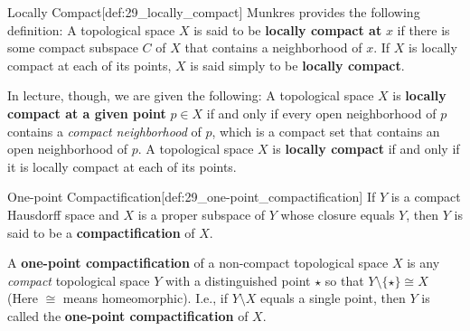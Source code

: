 \begin{defBox}{Locally Compact}[def:29_locally_compact]
    Munkres provides the following definition: A topological space \( X \) is said 
    to be \textbf{locally compact at} \( x \) if there is some compact subspace \( C \)
    of \( X \) that contains a neighborhood of \( x \).
    If \( X \) is locally compact at each of its points, \( X \) is said simply 
    to be \textbf{locally compact}.

    \baseSkip 

    In lecture, though, we are given the following:
    A topological space \( X \) is 
    \textbf{locally compact at a given point} \( p \in X \) if and only 
    if every open neighborhood of \( p \) contains a \textit{compact
    neighborhood} of \( p \), which is a compact set that contains an open 
    neighborhood of \( p \).
    A topological space \( X \) is \textbf{locally compact} if and only
    if it is locally compact at each of its points.
\end{defBox}

\begin{defBox}{One-point Compactification}[def:29_one-point_compactification]
    If \( Y \) is a compact Hausdorff space and \( X \) is a proper 
    subspace of \( Y \) whose closure equals \( Y \), then \( Y \) is said to
    be a \textbf{compactification} of \( X \).

    \baseSkip
    
    A \textbf{one-point compactification} of a non-compact topological space
    \( X \) is any \textit{compact} topological space \( Y \) with a 
    distinguished point \( \star \) so that 
    \( Y \setminus \{ \star \} \cong X \) (Here \( \cong \) means homeomorphic).
    I.e., if \( Y \setminus X \) equals a single point, then \( Y \) is called
    the \textbf{one-point compactification} of \( X \).
\end{defBox}
